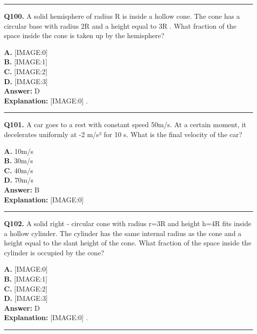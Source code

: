 \documentclass[12pt]{article}
\begin{document}
\hrule
\vspace{1em}


\noindent
\textbf{Q100.} A solid hemisphere of radius R
is inside a hollow cone. The cone has a circular base with radius 2R
and a height equal to 3R
. What fraction of the space inside the cone is taken up by the hemisphere?



\textbf{A.} [IMAGE:0] \\
\textbf{B.} [IMAGE:1] \\
\textbf{C.} [IMAGE:2] \\
\textbf{D.} [IMAGE:3] \\

\textbf{Answer:} D \\
\textbf{Explanation:} [IMAGE:0]
.

\hrule
\vspace{1em}


\noindent
\textbf{Q101.} A car goes to a rest with constant speed 50m/s. At a certain moment, it decelerates uniformly at -2 m/s² for 10 s. What is the final velocity of the car?



\textbf{A.} 10m/s \\
\textbf{B.} 30m/s \\
\textbf{C.} 40m/s \\
\textbf{D.} 70m/s \\

\textbf{Answer:} B \\
\textbf{Explanation:} [IMAGE:0]

\hrule
\vspace{1em}


\noindent
\textbf{Q102.} A solid right - circular cone with radius r=3R
and height h=4R
fits inside a hollow cylinder. The cylinder has the same internal radius as the cone and a height equal to the slant height of the cone. What fraction of the space inside the cylinder is occupied by the cone?



\textbf{A.} [IMAGE:0] \\
\textbf{B.} [IMAGE:1] \\
\textbf{C.} [IMAGE:2] \\
\textbf{D.} [IMAGE:3] \\

\textbf{Answer:} D \\
\textbf{Explanation:} [IMAGE:0]
.

\hrule
\vspace{1em}
\end{document}
